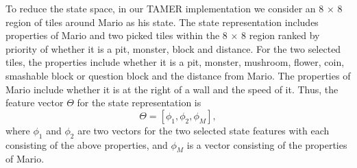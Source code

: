 \documentclass[10pt,journal,compsoc]{IEEEtran}
\begin{document}
To reduce the state space, in our TAMER implementation we consider an 8 $\times$ 8 region of tiles around Mario as his state. The state representation includes properties of Mario and two picked tiles within the 8 $\times$ 8 region ranked by priority of whether it is a pit, monster, block and distance. %
For the two selected tiles, the properties include whether it is a pit, monster, mushroom, flower, coin, smashable block or question block and the distance from Mario. The properties of Mario include whether it is at the right of a wall and the speed of it.
Thus, the feature vector $\Theta$ for the state representation is 
\begin{equation}
\label{eqn:sr}
 \Theta = [\phi_{1}, \phi_{2}, \phi_{M}],
\end{equation}
where $\phi_{1}$ and $\phi_{2}$ are two vectors for the two selected state features with each consisting of the above properties, and $\phi_{M}$ is a vector consisting of the properties of Mario.
\end{document}
